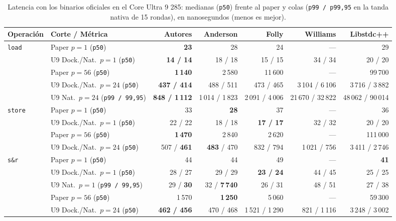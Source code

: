 \documentclass[11pt,a4paper]{article}
\begin{document}
\begin{table}[H]
\centering
\caption{Latencia con los binarios oficiales en el Core Ultra 9 285: medianas (\texttt{p50}) frente al paper y colas (\texttt{p99 / p99,95} en la tanda nativa de 15 rondas), en nanosegundos (menos es mejor).}
\label{tab:latencia}
\scriptsize
\setlength{\tabcolsep}{3.5pt}
\begin{tabular}{@{}l l r r r r r@{}}
\toprule
\textbf{Operación} & \textbf{Corte / Métrica} & \textbf{Autores} & \textbf{Anderson} & \textbf{Folly} & \textbf{Williams} & \textbf{Libstdc++} \\
\midrule
\multirow{5}{*}{\texttt{load}}
  & Paper $p{=}1$ (\texttt{p50}) & \textbf{23} & 28 & 24 & — & 29 \\
  & U9 Dock./Nat.\ $p{=}1$ (\texttt{p50}) & \textbf{14 / 14} & 18 / 18 & 15 / 15 & 34 / 34 & 20 / 20 \\
  & Paper $p{=}56$ (\texttt{p50}) & \textbf{1\,140} & 2\,580 & 11\,600 & — & 99\,700 \\
  & U9 Dock./Nat.\ $p{=}24$ (\texttt{p50}) & \textbf{437 / 414} & 488 / 511 & 473 / 465 & 3\,104 / 6\,106 & 3\,716 / 3\,882 \\
  & U9 Nat.\ $p{=}24$ (\texttt{p99 / 99,95}) & \textbf{848 / 1\,112} & 1\,014 / 1\,823 & 2\,091 / 4\,006 & 21\,670 / 32\,822 & 48\,062 / 90\,014 \\
\midrule
\multirow{4}{*}{\texttt{store}}
  & Paper $p{=}1$ (\texttt{p50}) & 33 & \textbf{28} & 37 & — & 36 \\
  & U9 Dock./Nat.\ $p{=}1$ (\texttt{p50}) & 22 / 22 & 18 / 18 & \textbf{17 / 17} & 32 / 32 & 20 / 20 \\
  & Paper $p{=}56$ (\texttt{p50}) & \textbf{1\,470} & 2\,840 & 2\,620 & — & 111\,000 \\
  & U9 Dock./Nat.\ $p{=}24$ (\texttt{p50}) & 507 / \textbf{461} & \textbf{483} / 470 & 832 / 794 & 1\,021 / 756 & 3\,411 / 2\,746 \\
\midrule
\multirow{5}{*}{\texttt{s\&r}}
  & Paper $p{=}1$ (\texttt{p50}) & 44 & 44 & 49 & — & \textbf{41} \\
  & U9 Dock./Nat.\ $p{=}1$ (\texttt{p50}) & 28 / 27 & 29 / 29 & \textbf{23 / 24} & 44 / 45 & 25 / 25 \\
  & U9 Nat.\ $p{=}1$ (\texttt{p99 / 99,95}) & 29 / \textbf{30} & 32 / \textbf{7\,740} & 26 / 31 & 48 / 51 & 27 / 38 \\
  & Paper $p{=}56$ (\texttt{p50}) & 1\,570 & \textbf{1\,250} & 5\,060 & — & 59\,300 \\
  & U9 Dock./Nat.\ $p{=}24$ (\texttt{p50}) & \textbf{462 / 456} & 470 / 468 & 1\,521 / 1\,290 & 821 / 1\,116 & 3\,248 / 3\,002 \\
\bottomrule
\end{tabular}
\par{}
\end{table}
\end{document}
